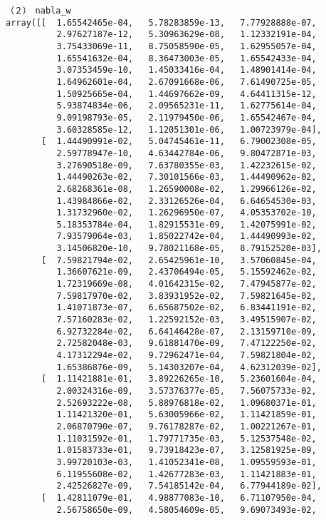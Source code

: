 \documentclass[11pt,a4j,fleqn]{jarticle}
\begin{document}
\begin{verbatim}
（２）　nabla_w
array([[  1.65542465e-04,   5.78283859e-13,   7.77928888e-07,
          2.97627187e-12,   5.30963629e-08,   1.12332191e-04,
          3.75433069e-11,   8.75058590e-05,   1.62955057e-04,
          1.65541632e-04,   8.36473003e-05,   1.65542433e-04,
          3.07353459e-10,   1.45033416e-04,   1.48901414e-04,
          1.64962601e-04,   2.67091668e-06,   7.61490725e-05,
          1.50925665e-04,   1.44697662e-09,   4.64411315e-12,
          5.93874834e-06,   2.09565231e-11,   1.62775614e-04,
          9.09198793e-05,   2.11979450e-06,   1.65542467e-04,
          3.60328585e-12,   1.12051301e-06,   1.00723979e-04],
       [  1.44490991e-02,   5.04745461e-11,   6.79002308e-05,
          2.59778947e-10,   4.63442784e-06,   9.80472871e-03,
          3.27690518e-09,   7.63780355e-03,   1.42232615e-02,
          1.44490263e-02,   7.30101566e-03,   1.44490962e-02,
          2.68268361e-08,   1.26590008e-02,   1.29966126e-02,
          1.43984866e-02,   2.33126526e-04,   6.64654530e-03,
          1.31732960e-02,   1.26296950e-07,   4.05353702e-10,
          5.18353784e-04,   1.82915531e-09,   1.42075991e-02,
          7.93579064e-03,   1.85022742e-04,   1.44490993e-02,
          3.14506820e-10,   9.78021168e-05,   8.79152520e-03],
       [  7.59821794e-02,   2.65425961e-10,   3.57060845e-04,
          1.36607621e-09,   2.43706494e-05,   5.15592462e-02,
          1.72319669e-08,   4.01642315e-02,   7.47945877e-02,
          7.59817970e-02,   3.83931952e-02,   7.59821645e-02,
          1.41071873e-07,   6.65687502e-02,   6.83441191e-02,
          7.57160283e-02,   1.22592152e-03,   3.49515907e-02,
          6.92732284e-02,   6.64146428e-07,   2.13159710e-09,
          2.72582048e-03,   9.61881470e-09,   7.47122250e-02,
          4.17312294e-02,   9.72962471e-04,   7.59821804e-02,
          1.65386876e-09,   5.14303207e-04,   4.62312039e-02],
       [  1.11421881e-01,   3.89226265e-10,   5.23601604e-04,
          2.00324316e-09,   3.57376377e-05,   7.56075733e-02,
          2.52693222e-08,   5.88976818e-02,   1.09680371e-01,
          1.11421320e-01,   5.63005966e-02,   1.11421859e-01,
          2.06870790e-07,   9.76178287e-02,   1.00221267e-01,
          1.11031592e-01,   1.79771735e-03,   5.12537548e-02,
          1.01583733e-01,   9.73918423e-07,   3.12581925e-09,
          3.99720103e-03,   1.41052341e-08,   1.09559593e-01,
          6.11955608e-02,   1.42677283e-03,   1.11421883e-01,
          2.42526827e-09,   7.54185142e-04,   6.77944189e-02],
       [  1.42811079e-01,   4.98877083e-10,   6.71107950e-04,
          2.56758650e-09,   4.58054609e-05,   9.69073493e-02,

\end{verbatim}
\end{document}

